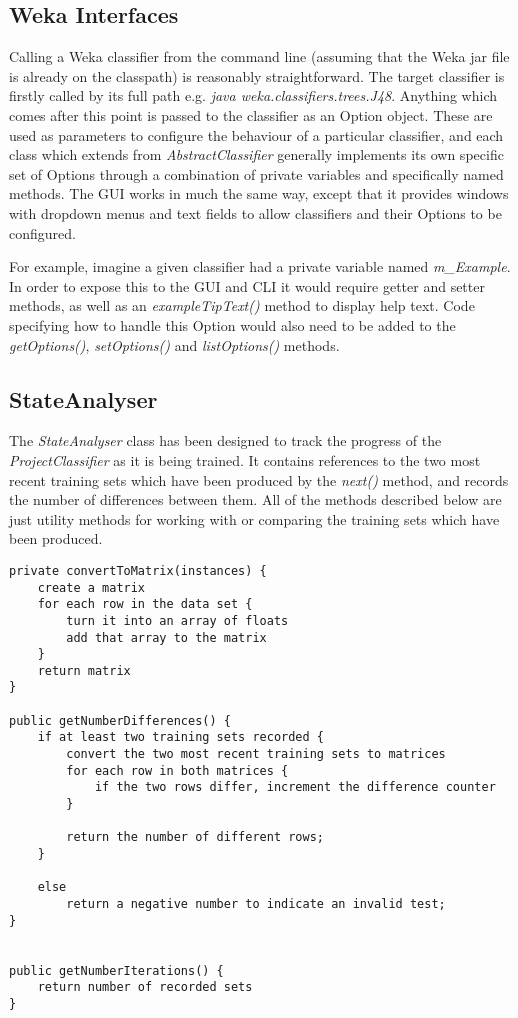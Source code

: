 \subsection{Weka Interfaces}
Calling a Weka classifier from the command line (assuming that the Weka jar file is already on the classpath) is reasonably straightforward. The target classifier is firstly called by its full path e.g.  \textit{java weka.classifiers.trees.J48}. Anything which comes after this point is passed to the classifier as an Option object. These are used as parameters to configure the behaviour of a particular classifier, and each class which extends from \textit{AbstractClassifier} generally implements its own specific set of Options through a combination of private variables and specifically named methods. The GUI works in much the same way, except that it provides windows with dropdown menus and text fields to allow classifiers and their Options to be configured.  

For example, imagine a given classifier had a private variable named \textit{m\_Example}. In order to expose this to the GUI and CLI it would require getter and setter methods, as well as an \textit{exampleTipText()} method to display help text. Code specifying how to handle this Option would also need to be added to the \textit{getOptions()}, \textit{setOptions()} and \textit{listOptions()} methods. 

\subsection{StateAnalyser}
The \textit{StateAnalyser} class has been designed to track the progress of the \textit{ProjectClassifier} as it is being trained. It contains references to the two most recent training sets which have been produced by the \textit{next()} method, and records the number of differences between them. All of the methods described below are just utility methods for working with or comparing the training sets which have been produced.

\begin{footnotesize}
\begin{verbatim}
private convertToMatrix(instances) {
    create a matrix
    for each row in the data set {
        turn it into an array of floats
        add that array to the matrix
    }
    return matrix
}

public getNumberDifferences() {
    if at least two training sets recorded {
        convert the two most recent training sets to matrices
        for each row in both matrices {
            if the two rows differ, increment the difference counter
        }

        return the number of different rows;
    }

    else
        return a negative number to indicate an invalid test;
}


public getNumberIterations() {
    return number of recorded sets
}
\end{verbatim}
\end{footnotesize}
